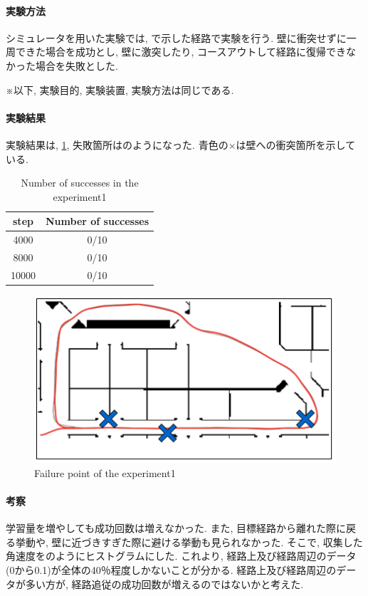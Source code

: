 \newpage
\paragraph{実験方法}
シミュレータを用いた実験では, で示した経路で実験を行う. 壁に衝突せずに一周できた場合を成功とし, 壁に激突したり, コースアウトして経路に復帰できなかった場合を失敗とした. \par ※以下, 実験目的, 実験装置, 実験方法は同じである. 

\paragraph{実験結果}
実験結果は, \ref{tb:exp1}, 失敗箇所はのようになった. 青色の×は壁への衝突箇所を示している. 

\begin{table}[h]
  \centering
  \begin{tabular}{|c|c|} \hline
    step & Number of successes \\ \hline
    4000 & 0/10 \\ \hline
    8000 & 0/10 \\ \hline
    10000 & 0/10 \\ \hline
  \end{tabular}
  \caption{Number of successes in the experiment1}
  \label{tb:exp1}
\end{table}

\begin{figure}[h]
  \centering
  \includegraphics[keepaspectratio, scale=0.5]{images/result1.png}
  \caption{Failure point of the experiment1}
  \label{Fig:result1}
  \end{figure}

\newpage
\paragraph{考察}
学習量を増やしても成功回数は増えなかった.  また, 目標経路から離れた際に戻る挙動や, 壁に近づきすぎた際に避ける挙動も見られなかった. そこで, 収集した角速度をのようにヒストグラムにした. これより, 経路上及び経路周辺のデータ(0から0.1)が全体の40％程度しかないことが分かる. 経路上及び経路周辺のデータが多い方が, 経路追従の成功回数が増えるのではないかと考えた. 

